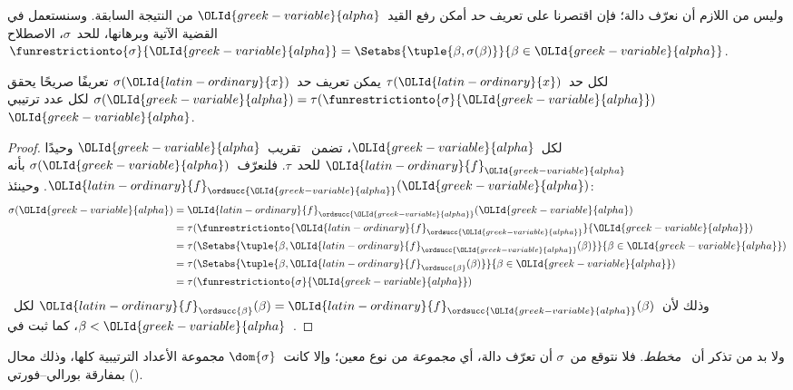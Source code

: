 \documentclass[../../../include/open-logic-section]{subfiles}
\begin{document}
وليس من اللازم أن نعرّف دالة؛ فإن اقتصرنا على تعريف \emph{حد} أمكن
رفع القيد~$\OLId{greek-variable}{alpha}$ من النتيجة السابقة. وسنستعمل في القضية الآتية
وبرهانها، للحد~$\sigma$، الاصطلاح
$\funrestrictionto{\sigma}{\OLId{greek-variable}{alpha}} = \Setabs{\tuple{\beta, \sigma(\beta)}}{\beta \in \OLId{greek-variable}{alpha}}$.

\begin{thm}
لكل حد~$\tau(\OLId{latin-ordinary}{x})$ يمكن تعريف حد~$\sigma(\OLId{latin-ordinary}{x})$ تعريفًا صريحًا يحقق
$\sigma(\OLId{greek-variable}{alpha}) = \tau(\funrestrictionto{\sigma}{\OLId{greek-variable}{alpha}})$ لكل عدد
ترتيبي~$\OLId{greek-variable}{alpha}$.
\end{thm}

\begin{proof}
لكل~$\OLId{greek-variable}{alpha}$، تضمن~ تقريب~$\OLId{greek-variable}{alpha}$ وحيدًا
$\OLId{latin-ordinary}{f}_\OLId{greek-variable}{alpha}$ للحد~$\tau$. فلنعرّف~$\sigma(\OLId{greek-variable}{alpha})$ بأنه
$\OLId{latin-ordinary}{f}_{\ordsucc{\OLId{greek-variable}{alpha}}}(\OLId{greek-variable}{alpha})$. وحينئذ:
\begin{align*}
\sigma(\OLId{greek-variable}{alpha}) &=
\OLId{latin-ordinary}{f}_{\ordsucc{\OLId{greek-variable}{alpha}}}(\OLId{greek-variable}{alpha}) \\&=
\tau(\funrestrictionto{\OLId{latin-ordinary}{f}_{\ordsucc{\OLId{greek-variable}{alpha}}}}{\OLId{greek-variable}{alpha}}) \\&=
\tau(\Setabs{\tuple{\beta, \OLId{latin-ordinary}{f}_{\ordsucc{\OLId{greek-variable}{alpha}}}(\beta)}}{\beta \in \OLId{greek-variable}{alpha}}) \\&=
\tau(\Setabs{\tuple{\beta, \OLId{latin-ordinary}{f}_{\ordsucc{\beta}}(\beta)}}{\beta \in \OLId{greek-variable}{alpha}})\\&=
\tau(\funrestrictionto{\sigma}{\OLId{greek-variable}{alpha}})
\end{align*}
وذلك لأن~$\OLId{latin-ordinary}{f}_{\ordsucc{\beta}}(\beta) = \OLId{latin-ordinary}{f}_{\ordsucc{\OLId{greek-variable}{alpha}}}(\beta)$
لكل~$\beta < \OLId{greek-variable}{alpha}$، كما ثبت في~.
\end{proof}
\noindent
ولا بد من تذكر أن~ \emph{مخطط}. فلا
نتوقع من~$\sigma$ أن تعرّف دالة، أي \emph{مجموعة} من نوع معين؛
وإلا كانت~$\dom{\sigma}$ مجموعة الأعداد الترتيبية كلها، وذلك محال
بمفارقة بورالي--فورتي ().
\end{document}
